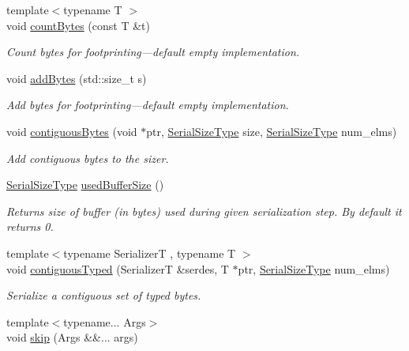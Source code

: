 \begin{DoxyCompactItemize}
{\footnotesize template$<$typename T $>$ }\\void \hyperlink{structcheckpoint_1_1_serializer_a805ae9ce395614512dfb6b0bd2c22881}{count\+Bytes} (const T \&t)
\begin{DoxyCompactList}\small\item\em Count bytes for footprinting---default empty implementation. \end{DoxyCompactList}\item 
void \hyperlink{structcheckpoint_1_1_serializer_a52cd27806c3b821605d723900ec7d2e5}{add\+Bytes} (std\+::size\+\_\+t s)
\begin{DoxyCompactList}\small\item\em Add bytes for footprinting---default empty implementation. \end{DoxyCompactList}\item 
void \hyperlink{structcheckpoint_1_1_serializer_a347ccc63a31ac26ca1989aea73a51a52}{contiguous\+Bytes} (void $\ast$ptr, \hyperlink{namespacecheckpoint_a083f6674da3f94c2901b18c6d238217c}{Serial\+Size\+Type} size, \hyperlink{namespacecheckpoint_a083f6674da3f94c2901b18c6d238217c}{Serial\+Size\+Type} num\+\_\+elms)
\begin{DoxyCompactList}\small\item\em Add contiguous bytes to the sizer. \end{DoxyCompactList}\item 
\hyperlink{namespacecheckpoint_a083f6674da3f94c2901b18c6d238217c}{Serial\+Size\+Type} \hyperlink{structcheckpoint_1_1_serializer_a9193aca9404eadbb6617273d0fb1343b}{used\+Buffer\+Size} ()
\begin{DoxyCompactList}\small\item\em Returns size of buffer (in bytes) used during given serialization step. By default it returns 0. \end{DoxyCompactList}\item 
{\footnotesize template$<$typename SerializerT , typename T $>$ }\\void \hyperlink{structcheckpoint_1_1_serializer_af2f453fc63424918a16ea6024d576a3e}{contiguous\+Typed} (SerializerT \&serdes, T $\ast$ptr, \hyperlink{namespacecheckpoint_a083f6674da3f94c2901b18c6d238217c}{Serial\+Size\+Type} num\+\_\+elms)
\begin{DoxyCompactList}\small\item\em Serialize a contiguous set of typed bytes. \end{DoxyCompactList}\item 
{\footnotesize template$<$typename... Args$>$ }\\void \hyperlink{structcheckpoint_1_1_serializer_ae0224c5bad49a1bd2af178987adb84f9}{skip} (Args \&\&... args)

\end{DoxyCompactItemize}
